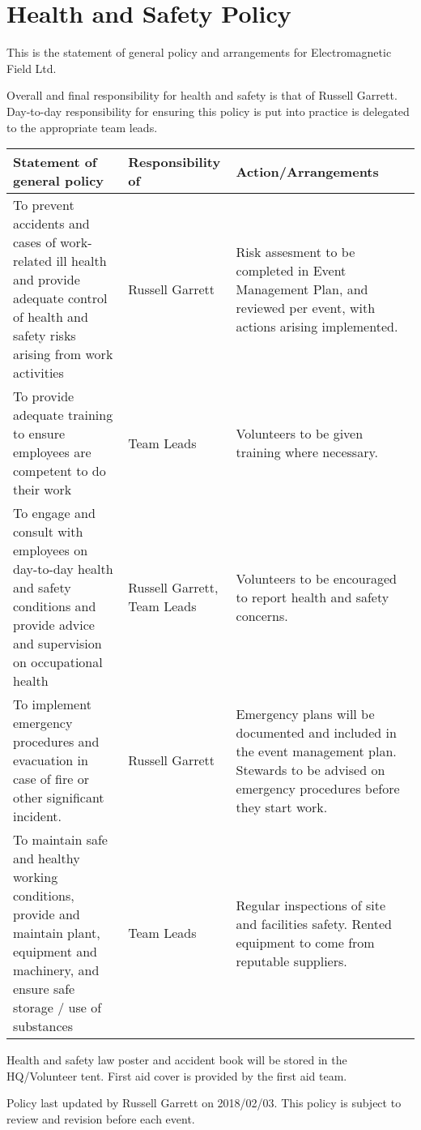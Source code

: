 



\section{Health and Safety Policy}

This is the statement of general policy and arrangements for Electromagnetic Field Ltd.

Overall and final responsibility for health and safety is that of Russell Garrett.
Day-to-day responsibility for ensuring this policy is put into practice is delegated to the appropriate team leads.

\tabulinesep=2mm
\begin{tabu}{| p{7cm} | p{3cm} | p{5cm} |} \hline
  \rowfont{\bfseries} Statement of general policy & Responsibility of & Action/Arrangements \\ \hline
To prevent accidents and cases of work-related ill health and provide adequate control of health and safety risks arising from work activities & Russell Garrett & Risk assesment to be completed in Event Management Plan, and reviewed per event, with actions arising implemented. \\ \hline
To provide adequate training to ensure employees are competent to do their work & Team Leads & Volunteers to be given training where necessary. \\ \hline
To engage and consult with employees on day-to-day health and safety conditions and provide advice and supervision on occupational health & Russell Garrett, Team Leads & Volunteers to be encouraged to report health and safety concerns. \\ \hline
To implement emergency procedures and evacuation in case of fire or other significant incident. & Russell Garrett & Emergency plans will be documented and included in the event management plan. Stewards to be advised on emergency procedures before they start work. \\ \hline
To maintain safe and healthy working conditions, provide and maintain plant, equipment and machinery, and ensure safe storage / use of substances & Team Leads & Regular inspections of site and facilities safety. Rented equipment to come from reputable suppliers. \\ \hline
\end{tabu}

Health and safety law poster and accident book will be stored in the HQ/Volunteer tent. First aid cover is provided by the first aid team.

Policy last updated by Russell Garrett on 2018/02/03. This policy is subject to review and revision before each event.

